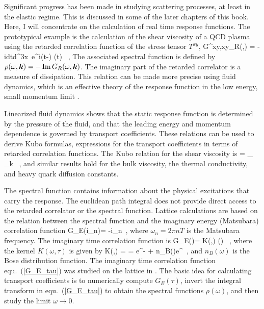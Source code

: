 Significant progress has been made in studying scattering processes,
at least in the elastic regime. This is discussed in some of the later 
chapters of this book. Here, I will concentrate on the calculation
of real time response functions. The prototypical example is the 
calculation of the shear viscosity of a QCD plasma using the retarded 
correlation function of the stress tensor $T^{xy}$, 
\be
\label{G_ret}
G^{xy,xy}_R(\omega,) = -i\int dt\int d^3x\, 
  e^{i(\omega t-\cdot{})} \Theta(t)
  \langle {}\rangle\, , 
\ee
The associated spectral function is defined by $\rho(\omega,\vec{k})
=-\,{\rm Im}\,G_R(\omega,\vec{k})$. The imaginary part of the retarded 
correlator is a measure of dissipation. This relation can be made 
more precise using fluid dynamics, which is an effective theory of 
the response function in the low energy, small momentum limit 
\cite{Schafer:2009dj,Schaefer:2014awa}. 

 Linearized fluid dynamics shows that the static response function is
determined by the pressure of the fluid, and that the leading energy and
momentum dependence is governed by transport coefficients. These
relations can be used to derive Kubo formulas, expressions for the 
transport coefficients in terms of retarded correlation functions. 
The Kubo relation for the shear viscosity is 
\be 
\label{eta_kubo}
\eta = \lim_{\omega{}} \lim_{k} 
   \, ,
\ee
and similar results hold for the bulk viscosity, the thermal conductivity, 
and heavy quark diffusion constants. 

 The spectral function contains information about the physical
excitations that carry the response. The euclidean path integral does 
not provide direct access to the retarded correlator or the spectral
function. Lattice calculations are based on the relation between the 
spectral function and the imaginary energy (Matsubara) correlation 
function 
\be 
\label{G_E_w}
G_E(i\omega_n)= \int {} \frac{\rho(\omega)}
 {\omega-i\omega_n}\, , 
\ee
where $\omega_n=2\pi nT$ is the Matsubara frequency. The imaginary
time correlation function is 
\be 
\label{G_E_tau}
G_E(\tau)= \int {} K(\omega,\tau) \rho(\omega) \, , 
\ee
where the kernel $K(\omega,\tau)$ is given by 
\be 
\label{Ker}
K(\omega,\tau) = 
 =   e^{-\omega\tau}
      + n_B(\omega)e^{\omega\tau}\, ,
\ee
and $n_B(\omega)$ is the Bose distribution function. The imaginary time 
correlation function equ.~(\ref{G_E_tau}) was studied on the lattice 
in \cite{Karsch:1986cq,Meyer:2007ic,Meyer:2007dy,Sakai:2007cm}. The 
basic idea for calculating transport coefficients is to numerically 
compute $G_E(\tau)$, invert the integral transform in equ.~(\ref{G_E_tau}) 
to obtain the spectral functions $\rho(\omega)$, and then study the 
limit $\omega\to 0$.

